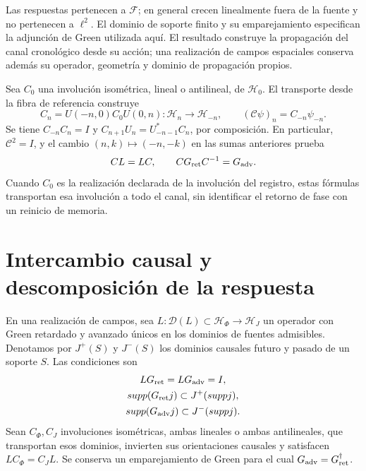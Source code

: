 Las respuestas pertenecen a \(\mathcal F\); en general crecen
linealmente fuera de la fuente y no pertenecen a \(\ell^2\).
El dominio de soporte finito y su emparejamiento especifican la adjunción
de Green utilizada aquí. El resultado construye la propagación del canal
cronológico desde su acción; una realización de campos espaciales conserva
además su operador, geometría y dominio de propagación propios.

Sea \(C_0\) una involución isométrica, lineal o antilineal, de
\(\mathcal H_0\). El transporte desde la fibra de referencia construye
\[
 C_n=U(-n,0)C_0U(0,n):\mathcal H_n\longrightarrow\mathcal H_{-n},
 \qquad (\mathcal C\psi)_n=C_{-n}\psi_{-n}.
\]
Se tiene \(C_{-n}C_n=I\) y
\(C_{n+1}U_n=U_{-n-1}^*C_n\), por composición.
En particular, \(\mathcal C^2=I\), y el cambio \((n,k)\mapsto(-n,-k)\)
en las sumas anteriores prueba
\begin{equation}
 \mathcal C L=L\mathcal C,\qquad
 \mathcal C G_{\rm ret}\mathcal C^{-1}=G_{\rm adv}.
 \label{x_reciprocidad:vii:eq:intercambio-green-cronologico}
\end{equation}
Cuando \(C_0\) es la realización declarada de la involución del registro,
estas fórmulas transportan esa involución a todo el canal, sin identificar
el retorno de fase con un reinicio de memoria.

\section{Intercambio causal y descomposición de la respuesta}
\label{x_reciprocidad:vii:subsec:green-realizacion-campos}

En una realización de campos, sea
\(L:\mathcal D(L)\subset\mathcal H_\Phi\to\mathcal H_J\)
un operador con Green retardado y avanzado únicos en los dominios de
fuentes admisibles. Denotamos por \(J^+(S)\) y \(J^-(S)\) los
dominios causales futuro y pasado de un soporte \(S\). Las condiciones son
\[
 \begin{gathered}
 LG_{\rm ret}=LG_{\rm adv}=I,\\
 \operatorname{supp}(G_{\rm ret}j)\subset J^+(\operatorname{supp}j),\\
 \operatorname{supp}(G_{\rm adv}j)\subset J^-(\operatorname{supp}j).
 \end{gathered}
\]
Sean \(C_\Phi,C_J\) involuciones isométricas, ambas lineales o ambas
antilineales, que transportan esos dominios,
invierten sus orientaciones causales y satisfacen
\(LC_\Phi=C_JL\). Se conserva un emparejamiento de Green para el cual
\(G_{\rm adv}=G_{\rm ret}^{\dagger}\).

